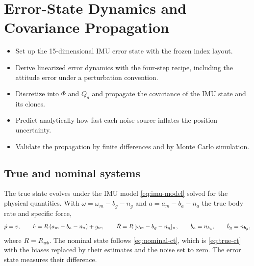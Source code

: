 \chapter{Error-State Dynamics and Covariance Propagation}
\label{ch:errordyn}

\begin{objectives}
\begin{itemize}
  \item Set up the 15-dimensional IMU error state with the frozen index layout.
  \item Derive linearized error dynamics with the four-step recipe, including the attitude error under a
        perturbation convention.
  \item Discretize into $\Phi$ and $Q_d$ and propagate the covariance of the IMU state and its clones.
  \item Predict analytically how fast each noise source inflates the position uncertainty.
  \item Validate the propagation by finite differences and by Monte Carlo simulation.
\end{itemize}
\end{objectives}

\section{True and nominal systems}

The true state evolves under the IMU model \eqref{eq:imu-model} solved for the physical quantities. With
$\omega = \omega_m - b_g - n_g$ and $a = a_m - b_a - n_a$ the true body rate and specific force,
\begin{equation}
  \dot p = v, \qquad \dot v = R\,(a_m - b_a - n_a) + g_w, \qquad \dot R = R\,[\omega_m - b_g - n_g]_{\times},
  \qquad \dot b_a = n_{b_a}, \qquad \dot b_g = n_{b_g},
  \label{eq:true-ct}
\end{equation}
where $R = R_{wb}$. The nominal state follows \eqref{eq:nominal-ct}, which is \eqref{eq:true-ct} with the biases replaced
by their estimates and the noise set to zero. The error state measures their difference.

